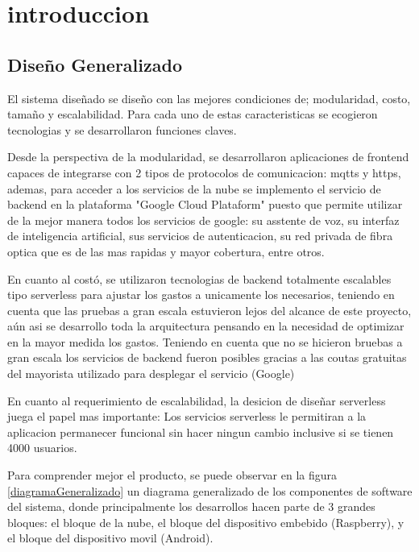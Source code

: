 \section{introduccion}








\subsection{Diseño Generalizado}

El sistema diseñado se diseño con las mejores condiciones de; modularidad, costo, tamaño y escalabilidad. Para cada uno de estas caracteristicas se ecogieron tecnologias y se desarrollaron funciones claves. 

Desde la perspectiva de la modularidad, se desarrollaron aplicaciones de frontend capaces de integrarse con 2 tipos de protocolos de comunicacion: mqtts y https, ademas, para acceder a los servicios de la nube se implemento el servicio de backend en la plataforma "Google Cloud Plataform" puesto que permite utilizar de la mejor manera todos los servicios de google: su asstente de voz, su interfaz de inteligencia artificial, sus servicios de autenticacion, su red privada de fibra optica que es de las mas rapidas y mayor cobertura, entre otros.

En cuanto al costó, se utilizaron tecnologias de backend totalmente escalables tipo serverless para ajustar los gastos a unicamente los necesarios, teniendo en cuenta que las pruebas a gran escala estuvieron lejos del alcance de este proyecto, aún asi se desarrollo toda la arquitectura pensando en la necesidad de optimizar en la mayor medida los gastos. Teniendo en cuenta que no se hicieron bruebas a gran escala los servicios de backend fueron posibles gracias a las coutas gratuitas del mayorista utilizado para desplegar el servicio (Google)

En cuanto al requerimiento de escalabilidad, la desicion de diseñar serverless juega el papel mas importante: Los servicios serverless le permitiran a la aplicacion permanecer funcional sin hacer ningun cambio inclusive si se tienen 4000 usuarios.

Para comprender mejor el producto, se puede observar en la figura \ref{diagramaGeneralizado} un diagrama generalizado de los componentes de software del sistema, donde principalmente los desarrollos hacen parte de 3 grandes bloques: el bloque de la nube, el bloque del dispositivo embebido (Raspberry), y el bloque del dispositivo movil (Android).

